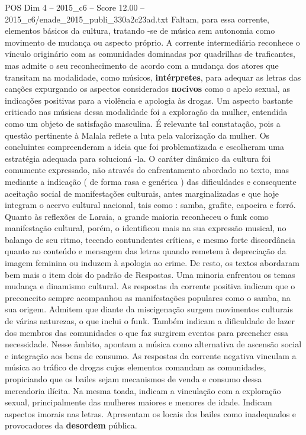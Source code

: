 \begin{textsample}{POS Dim 4 – 2015\_c6 – Score 12.00 – 2015\_c6/enade\_2015\_publi\_330a2c23ad.txt}
Faltam, para essa corrente, elementos básicos da cultura, tratando -se de música sem autonomia como movimento de mudança ou aspecto próprio.
A corrente intermediária reconhece o vínculo originário com as comunidades dominadas por quadrilhas de traficantes, mas admite o seu reconhecimento de acordo com a mudança dos atores que transitam na modalidade, como músicos, \textbf{intérpretes}, para adequar as letras das canções expurgando os aspectos considerados \textbf{nocivos} como o apelo sexual, as indicações positivas para a violência e apologia às drogas.
Um aspecto bastante criticado nas músicas dessa modalidade foi a exploração da mulher, entendida como um objeto de satisfação masculina.
É relevante tal constatação, pois a questão pertinente à Malala reflete a luta pela valorização da mulher.
Os concluintes compreenderam a ideia que foi problematizada e escolheram uma estratégia adequada para solucioná -la.
O caráter dinâmico da cultura foi comumente expressado, não através do enfrentamento abordado no texto, mas mediante a indicação ( de forma rasa e genérica ) das dificuldades e consequente aceitação social de manifestações culturais, antes marginalizadas e que hoje integram o acervo cultural nacional, tais como : samba, grafite, capoeira e forró.
Quanto às reflexões de Laraia, a grande maioria reconheceu o funk como manifestação cultural, porém, o identificou mais na sua expressão musical, no balanço de seu ritmo, tecendo contundentes críticas, e mesmo forte discordância quanto ao conteúdo e mensagem das letras quando remetem à depreciação da imagem feminina ou induzem à apologia ao crime.
De resto, os textos abordaram bem mais o item dois do padrão de Respostas.
Uma minoria enfrentou os temas mudança e dinamismo cultural.
As respostas da corrente positiva indicam que o preconceito sempre acompanhou as manifestações populares como o samba, na sua origem.
Admitem que diante da miscigenação surgem movimentos culturais de várias naturezas, o que inclui o funk.
Também indicam a dificuldade de lazer dos membros das comunidades o que faz surgirem eventos para preencher essa necessidade.
Nesse âmbito, apontam a música como alternativa de ascensão social e integração aos bens de consumo.
As respostas da corrente negativa vinculam a música ao tráfico de drogas cujos elementos comandam as comunidades, propiciando que os bailes sejam mecanismos de venda e consumo dessa mercadoria ilícita.
Na mesma toada, indicam a vinculação com a exploração sexual, principalmente das mulheres maiores e menores de idade.
Indicam aspectos imorais nas letras.
Apresentam os locais dos bailes como inadequados e provocadores da \textbf{desordem} pública.

\end{textsample}

